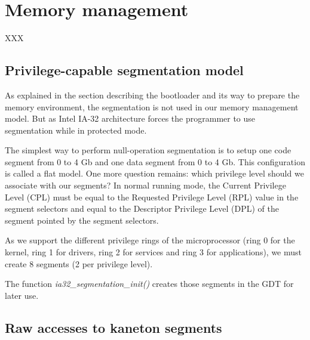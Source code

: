 %
%
%
%
%
%

%
%

\chapter{Memory management}

XXX

\newpage

%
%

\section{Privilege-capable segmentation model}

As explained in the section describing the bootloader and its way to
prepare the memory environment, the segmentation is not used in our
memory management model. But as Intel IA-32 architecture forces the
programmer to use segmentation while in protected mode.

The simplest way to perform null-operation segmentation is to setup
one code segment from 0 to 4 Gb and one data segment from 0 to 4
Gb. This configuration is called a flat model. One more question
remains: which privilege level should we associate with our segments?
In normal running mode, the Current Privilege Level (CPL) must be
equal to the Requested Privilege Level (RPL) value in the segment
selectors and equal to the Descriptor Privilege Level (DPL) of the
segment pointed by the segment selectors.

As we support the different privilege rings of the microprocessor
(ring 0 for the kernel, ring 1 for drivers, ring 2 for services and
ring 3 for applications), we must create 8 segments (2 per privilege
level).

The function \textit{ia32\_segmentation\_init()} creates those
segments in the GDT for later use.

%
%

\section{Raw accesses to kaneton segments}

